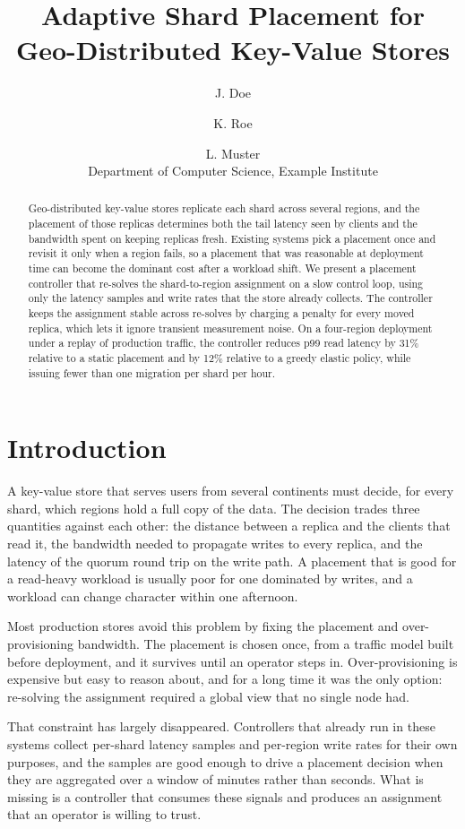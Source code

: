 ﻿\documentclass[10pt,twocolumn,letterpaper]{article}
\title{Adaptive Shard Placement for Geo-Distributed Key-Value Stores}
\author{J. Doe \and K. Roe \and L. Muster\\
Department of Computer Science, Example Institute}
\date{}
\begin{document}
\maketitle

\begin{abstract}
Geo-distributed key-value stores replicate each shard across several regions, and the
placement of those replicas determines both the tail latency seen by clients and the
bandwidth spent on keeping replicas fresh. Existing systems pick a placement once and
revisit it only when a region fails, so a placement that was reasonable at deployment
time can become the dominant cost after a workload shift. We present a placement
controller that re-solves the shard-to-region assignment on a slow control loop, using
only the latency samples and write rates that the store already collects. The controller
keeps the assignment stable across re-solves by charging a penalty for every moved
replica, which lets it ignore transient measurement noise. On a four-region deployment
under a replay of production traffic, the controller reduces p99 read latency by 31\%
relative to a static placement and by 12\% relative to a greedy elastic policy, while
issuing fewer than one migration per shard per hour.
\end{abstract}

\section{Introduction}
A key-value store that serves users from several continents must decide, for every
shard, which regions hold a full copy of the data. The decision trades three quantities
against each other: the distance between a replica and the clients that read it, the
bandwidth needed to propagate writes to every replica, and the latency of the quorum
round trip on the write path. A placement that is good for a read-heavy workload is
usually poor for one dominated by writes, and a workload can change character within one afternoon.

Most production stores avoid this problem by fixing the placement and over-provisioning
bandwidth. The placement is chosen once, from a traffic model built before deployment,
and it survives until an operator steps in. Over-provisioning is expensive but easy to
reason about, and for a long time it was the only option: re-solving the assignment
required a global view that no single node had.

That constraint has largely disappeared. Controllers that already run in these systems
collect per-shard latency samples and per-region write rates for their own purposes, and
the samples are good enough to drive a placement decision when they are aggregated over
a window of minutes rather than seconds. What is missing is a controller that consumes
these signals and produces an assignment that an operator is willing to trust.
\end{document}
